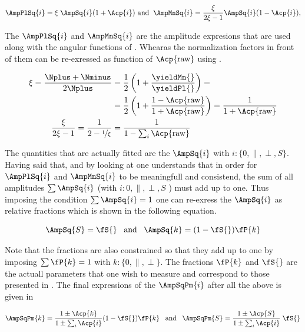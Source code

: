 \begin{equation}
\AmpPlSq{i} = \xi \; \AmpSq{i} (1+\Acp{i}) \,\, \text{and}\;\; \AmpMnSq{i} = \frac{\xi}{2\xi-1} \AmpSq{i} (1-\Acp{i}),
\label{acp_free}
\end{equation}

\noindent The $\AmpPlSq{i}$ and $\AmpMnSq{i}$ are the amplitude expresions that are used along with the angular functions of .
Whearas the normalization factors in front of them can be re-exressed as function of $\Acp{\text{raw}}$ using .

\begin{align}
\xi = \frac{\Nplus+\Nminus}{2\Nplus} &= \frac{1}{2}\left( 1 + \frac{\yieldMn{}}{\yieldPl{}}\right) = \nonumber \\ 
                                     &= \frac{1}{2}\left( 1 + \frac{1-\Acp{\text{raw}}}{1+\Acp{\text{raw}}}\right) =
                                        \frac{1}{1+\Acp{\text{raw}}}  \\
\frac{\xi}{2\xi-1} = \frac{1}{2-\nicefrac{1}{\xi}} &= \frac{1}{1-\sum_i\Acp{\text{raw}}}
\label{amp_norms}
\end{align}

The quantities that are actually fitted are the $\AmpSq{i}$ with $i:\{0,\parallel,\perp,S\}$. Having said that, and by looking at 
one understands that in order for $\AmpPlSq{i}$ and $\AmpMnSq{i}$ to be meaningfull and consistend, the sum of all amplitudes $\sum\AmpSq{i}$ 
(with $i:{0,\parallel,\perp,S}$ ) must add up to one. Thus imposing the condition $\sum\AmpSq{i} = 1$ one can re-exress the $\AmpSq{i}$
as relative fractions which is shown in the following equation.

\begin{equation}
\AmpSq{S} = \fS{} \;\;\;\text{and}\;\;\; \AmpSq{k} = (1-\fS{})\fP{k}
\label{amps_param}
\end{equation}

Note that the \pwave fractions are also constrained so that they add up to one by imposing $\sum\fP{k}=1$ with $k:\{0,\parallel,\perp\}$.
The fractions $\fP{k}$ and $\fS{}$ are the actuall parameters that one wish to measure and correspond to those presented in .
The final expressions of the $\AmpSqPm{i}$ after all the above is given in 

\begin{equation}
\AmpSqPm{k} = \frac{1\pm\Acp{k}}{1\pm\sum_i\Acp{i}}  (1-\fS{})\fP{k}  \;\;\; \text{and}\;\;\; \AmpSqPm{S} = \frac{1\pm\Acp{S}}{1\pm\sum_i\Acp{i}} \; \fS{}
\label{amps_final}
\end{equation}

